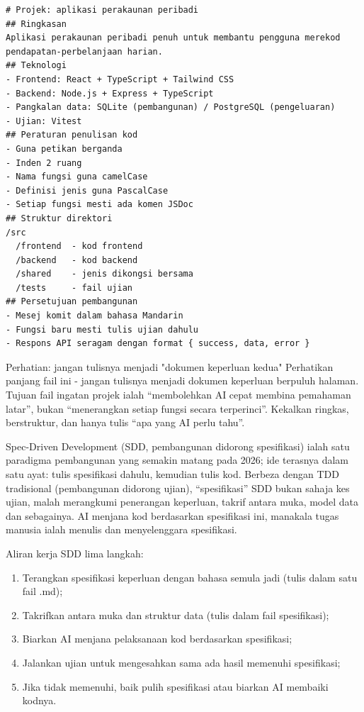 \begin{lstlisting}
# Projek: aplikasi perakaunan peribadi
## Ringkasan
Aplikasi perakaunan peribadi penuh untuk membantu pengguna merekod pendapatan-perbelanjaan harian.
## Teknologi
- Frontend: React + TypeScript + Tailwind CSS
- Backend: Node.js + Express + TypeScript
- Pangkalan data: SQLite (pembangunan) / PostgreSQL (pengeluaran)
- Ujian: Vitest
## Peraturan penulisan kod
- Guna petikan berganda
- Inden 2 ruang
- Nama fungsi guna camelCase
- Definisi jenis guna PascalCase
- Setiap fungsi mesti ada komen JSDoc
## Struktur direktori
/src
  /frontend  - kod frontend
  /backend   - kod backend
  /shared    - jenis dikongsi bersama
  /tests     - fail ujian
## Persetujuan pembangunan
- Mesej komit dalam bahasa Mandarin
- Fungsi baru mesti tulis ujian dahulu
- Respons API seragam dengan format { success, data, error }
\end{lstlisting}

\begin{tcbwarn}{Perhatian: jangan tulisnya menjadi "dokumen keperluan kedua"}
Perhatikan panjang fail ini - jangan tulisnya menjadi dokumen keperluan berpuluh halaman. Tujuan fail ingatan projek ialah “membolehkan AI cepat membina pemahaman latar”, bukan “menerangkan setiap fungsi secara terperinci”. Kekalkan ringkas, berstruktur, dan hanya tulis “apa yang AI perlu tahu”.

\end{tcbwarn}


Spec-Driven Development (SDD, pembangunan didorong spesifikasi) ialah satu paradigma pembangunan yang semakin matang pada 2026; ide terasnya dalam satu ayat: tulis spesifikasi dahulu, kemudian tulis kod. Berbeza dengan TDD tradisional (pembangunan didorong ujian), “spesifikasi” SDD bukan sahaja kes ujian, malah merangkumi penerangan keperluan, takrif antara muka, model data dan sebagainya. AI menjana kod berdasarkan spesifikasi ini, manakala tugas manusia ialah menulis dan menyelenggara spesifikasi.

Aliran kerja SDD lima langkah:

\begin{enumerate}
  \item Terangkan spesifikasi keperluan dengan bahasa semula jadi (tulis dalam satu fail .md);
  \item Takrifkan antara muka dan struktur data (tulis dalam fail spesifikasi);
  \item Biarkan AI menjana pelaksanaan kod berdasarkan spesifikasi;
  \item Jalankan ujian untuk mengesahkan sama ada hasil memenuhi spesifikasi;
  \item Jika tidak memenuhi, baik pulih spesifikasi atau biarkan AI membaiki kodnya.
\end{enumerate}

